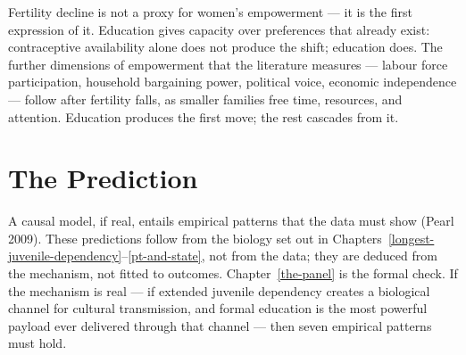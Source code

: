 \documentclass[12pt,letterpaper]{article}
\begin{document}
Fertility decline is not a proxy for women's empowerment --- it is the
first expression of it. Education gives capacity over preferences that
already exist: contraceptive availability alone does not produce the
shift; education does. The further dimensions of empowerment that the
literature measures --- labour force participation, household
bargaining power, political voice, economic independence --- follow
after fertility falls, as smaller families free time, resources, and
attention. Education produces the first move; the rest cascades from it.

\section{The Prediction}\label{the-prediction}

A causal model, if real, entails empirical patterns that the data
must show (Pearl 2009). These predictions follow from the biology
set out in Chapters~\ref{longest-juvenile-dependency}--\ref{pt-and-state},
not from the data; they are deduced from the mechanism, not fitted
to outcomes. Chapter~\ref{the-panel} is the formal check. If the
mechanism is real --- if extended juvenile dependency creates a
biological channel for cultural transmission, and formal education
is the most powerful payload ever delivered through that channel ---
then seven empirical patterns must hold.
\end{document}
